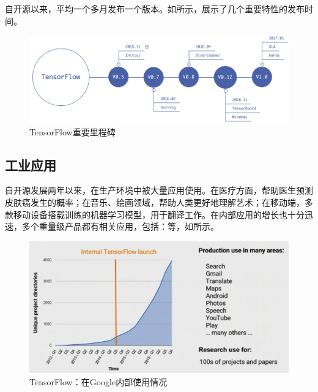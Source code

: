 \begin{content}
\tf{}自开源以来，平均一个多月发布一个版本。如所示，展示了\tf{}几个重要特性的发布时间。

\begin{figure}[!htbp]
\centering
\includegraphics[width=1.0\textwidth]{figures/tf-versions.png}
\caption{TensorFlow重要里程碑}
 \label{fig:tf-versions}
\end{figure}

\subsection{工业应用}

自开源发展两年以来，在生产环境中被大量应用使用。在医疗方面，帮助医生预测皮肤癌发生的概率；在音乐、绘画领域，帮助人类更好地理解艺术；在移动端，多款移动设备搭载训练的机器学习模型，用于翻译工作。在内部应用的增长也十分迅速，多个重量级产品都有相关应用，包括：等，如所示。

\begin{figure}[!htbp]
\centering
\includegraphics[width=1.0\textwidth]{figures/tf-google-apps.png}
\caption{TensorFlow：在Google内部使用情况}
 \label{fig:tf-google-apps}
\end{figure}

\end{content}
